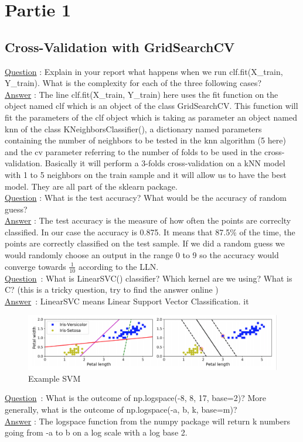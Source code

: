 \section{Partie 1}

\subsection{Cross-Validation with GridSearchCV}
\underline{Question} : Explain in your report what happens when we run clf.fit(X\_train, Y\_train). What is the complexity for each of the three following cases?  \\ 

\underline{Answer} :  The line clf.fit(X\_train, Y\_train) here uses the fit function on the object named clf which is an object of the class GridSearchCV. This function will fit the parameters of the clf object which is taking as parameter an object named knn of the class KNeighborsClassifier(), a dictionary named parameters containing the number of neighbors to be tested in the knn algorithm (5 here) and the cv parameter referring to the number of folds to be used in the cross-validation. Basically it will perform a 3-folds cross-validation on a kNN model with 1 to 5 neighbors on the train sample and it will allow us to have the best model. They are all part of the sklearn package. \\

\underline{Question} : What is the test accuracy? What would be the accuracy of random guess? \\

\underline{Answer} : The test accuracy is the measure of how often the points are correclty classified. In our case the accuracy is 0.875.  It means that 87.5\% of the time, the points are correctly classified on the test sample. If we did a random guess we would randomly choose an output in the range 0 to 9 so the accuracy would converge towards $\frac{1}{10}$ according to the LLN.  \\


\underline{Question} :  What is LinearSVC() classifier? Which kernel are we using? What is C? (this is a tricky question, try to find the answer online )\\

\underline{Answer} : LinearSVC means Linear Support Vector Classification. it  \\

\begin{figure}[ht]
	\centering 
	\includegraphics[scale = 0.35]{Pics/SVM}
	\caption{Example SVM}
\end{figure}

\underline{Question} : What is the outcome of np.logspace(-8, 8, 17, base=2)? More generally, what is the outcome of np.logspace(-a, b, k, base=m)?\\

\underline{Answer} : The logspace function from the numpy package will return k numbers going from -a to b on a log scale with a log base 2. 